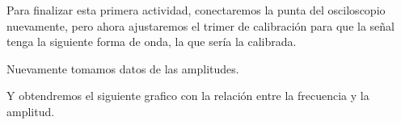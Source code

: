 Para finalizar esta primera actividad, conectaremos la punta del osciloscopio nuevamente, pero ahora ajustaremos el trimer de calibración para que la señal tenga la siguiente forma de onda, la que sería la calibrada.


Nuevamente tomamos datos de las amplitudes.

\begin{table}[H]
	\centering
{}
\end{table}


Y obtendremos el siguiente grafico con la relación entre la frecuencia y la amplitud.

